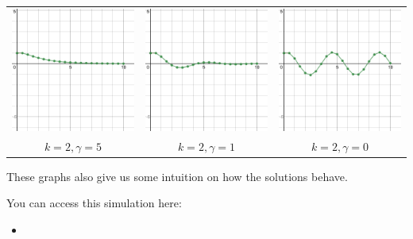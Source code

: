 \begin{center}
\begin{tabular}{ccc}
\includegraphics*[width=125pt]{images/module21-approx-k2g5.png}
	& \includegraphics*[width=125pt]{images/module21-approx-k2g1.png}
	& \includegraphics*[width=125pt]{images/module21-approx-k2g0.png} \\
$k=2,\gamma=5$ 
	& $k=2,\gamma=1$ 
	& $k=2,\gamma=0$
\end{tabular}
\end{center}

These graphs also give us some intuition on how the solutions behave.

\begin{graybox}
You can access this simulation here:
\begin{itemize}
	\item {}
\end{itemize}	
\end{graybox}














